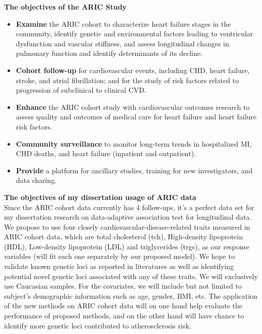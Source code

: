 \documentclass[12pt]{article}
\begin{document}
\textbf{The objectives of the ARIC Study}
\begin{itemize}
\item \textbf{Examine} the ARIC cohort to characterize heart failure stages in the community, identify genetic and environmental factors leading to ventricular dysfunction and vascular stiffness, and assess longitudinal changes in pulmonary function and identify determinants of its decline.

\item \textbf{Cohort follow-up} for cardiovascular events, including CHD, heart failure, stroke, and atrial fibrillation; and for the study of risk factors related to progression of subclinical to clinical CVD.

\item \textbf{Enhance} the ARIC cohort study with cardiovascular outcomes research to assess quality and outcomes of medical care for heart failure and heart failure risk factors.

\item \textbf{Community surveillance} to monitor long-term trends in hospitalized MI, CHD deaths, and heart failure (inpatient and outpatient).

\item \textbf{Provide} a platform for ancillary studies, training for new investigators, and data sharing.
\end{itemize} 


\textbf{The objectives of my dissertation usage of ARIC data}\\
Since the ARIC cohort data currently has 4 follow-ups, it's a perfect data set for my dissertation research on data-adaptive association test for longitudinal data. We propose to use four closely cardiovascular-disease-related traits measured in ARIC cohort data, which are total cholesterol (tch), High-density lipoprotein (HDL), Low-density lipoprotein (LDL) and triglycerides (trgs), as our response variables (will fit each one separately by our proposed model). We hope to validate known genetic loci as reported in literatures \cite{Teslovich2010,Lange2014,Peloso2014,Consortium2013,Maxwell2013} as well as identifying potential novel genetic loci associated with any of these traits. We will exclusively use Caucasian samples. For the covariates, we will include but not limited to subject's demographic information such as age, gender, BMI, etc. The application of the new methods on ARIC cohort data will on one hand help evaluate the performance of proposed methods, and on the other hand will have chance to identify more genetic loci contributed to atherosclerosis risk.
\end{document}
